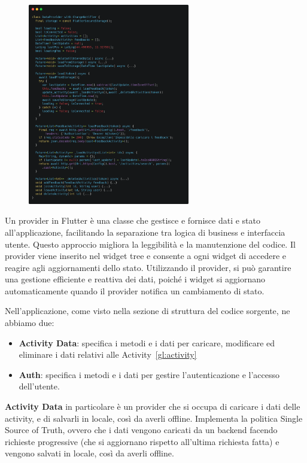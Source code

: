 \documentclass[a4paper,12pt]{article}
\begin{document}
\begin{figure}
    \includegraphics[width=0.63\textwidth]{img/data_provider.png}
\end{figure}
Un provider in Flutter è una classe che gestisce e fornisce dati e stato all'applicazione, facilitando la separazione tra logica di business e interfaccia utente. Questo approccio migliora la leggibilità e la manutenzione del codice. Il provider viene inserito nel widget tree e consente a ogni widget di accedere e reagire agli aggiornamenti dello stato. Utilizzando il provider, si può garantire una gestione efficiente e reattiva dei dati, poiché i widget si aggiornano automaticamente quando il provider notifica un cambiamento di stato. 

Nell'applicazione, come visto nella sezione di struttura del codice sorgente, ne abbiamo due:

\begin{itemize}
    \item \textbf{Activity Data}: specifica i metodi e i dati per caricare, modificare ed eliminare i dati relativi alle Activity~\ref{gl:activity}
    \item \textbf{Auth}: specifica i metodi e i dati per gestire l'autenticazione e l'accesso dell'utente.
\end{itemize}

\textbf{Activity Data} in particolare è un provider che si occupa di caricare i dati delle activity, e di salvarli in locale, così da averli offline.
Implementa la politica Single Source of Truth, ovvero che i dati vengono caricati da un backend facendo richieste progressive (che si aggiornano rispetto all'ultima richiesta fatta) e vengono salvati in locale, così da averli offline.
\end{document}
